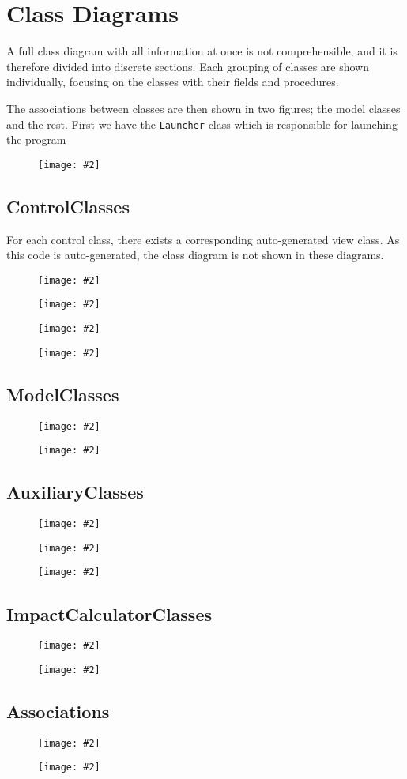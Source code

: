\section{Class Diagrams} \label{app:ClassDiagrams}
\newcommand{\diagram}[2]
{
\begin{figure}[H]
\centering
    \texttt{[image: \#2]}
\end{figure}
}

A full class diagram with all information at once is not comprehensible, and it is therefore divided into discrete sections. Each grouping of classes are shown individually, focusing on the classes with their fields and procedures.

The associations between classes are then shown in two figures; the model classes and the rest.
First we have the \texttt{Launcher} class which is responsible for launching the program
\diagram{page=1} {.ClassDiagrams/LauncherClassDiagram}

\subsection{\textbf{ControlClasses}}
For each control class, there exists a corresponding auto-generated view class. As this code is auto-generated, the class diagram is not shown in these diagrams.
\diagram{page=1, width = \linewidth} {.ClassDiagrams/Control_ViewClassDiagrams}
\diagram{page=2, width = \linewidth} {.ClassDiagrams/Control_ViewClassDiagrams}
\diagram{page=3, width = \linewidth} {.ClassDiagrams/Control_ViewClassDiagrams}
\diagram{page=4, width = \linewidth} {.ClassDiagrams/Control_ViewClassDiagrams}


\subsection{\textbf{ModelClasses}}
\diagram{page=1, width = \linewidth} {.ClassDiagrams/ModelClassDiagrams}
\diagram{page=2, width = \linewidth} {.ClassDiagrams/ModelClassDiagrams}

\subsection{\textbf{AuxiliaryClasses}}
\diagram{page=1} {.ClassDiagrams/AuxiliaryClassDiagrams}
\diagram{page=2} {.ClassDiagrams/AuxiliaryClassDiagrams}
\diagram{page=3} {.ClassDiagrams/AuxiliaryClassDiagrams}

\subsection{\textbf{ImpactCalculatorClasses}}
\diagram{page=1, width = \linewidth} {.ClassDiagrams/ImpactCalculatorClassDiagrams}
\diagram{page=2, width = \linewidth} {.ClassDiagrams/ImpactCalculatorClassDiagrams}

\subsection{Associations}
\diagram{page=1, width = \linewidth}
{.ClassDiagrams/Associativity}
\diagram{page=2, width = \linewidth}
{.ClassDiagrams/Associativity}